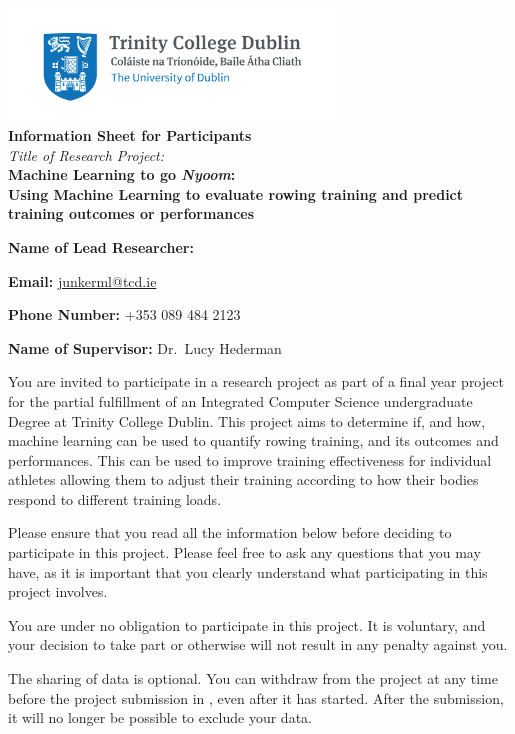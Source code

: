 \begin{center}
    \includegraphics[height=3cm]{info-sheet/Trinity_RGB_transparent_main.png}\\
    {\large\textbf{Information Sheet for Participants}}\\
    \textit{Title of Research Project:}\\
    \textbf{Machine Learning to go \emph{Nyoom}:}\\
    \textbf{Using Machine Learning to evaluate rowing training and predict training outcomes or performances}
\end{center}

\vspace{1cm}

\textbf{Name of Lead Researcher:} \authorname

\textbf{Email:} \href{mailto:junkerml@tcd.ie}{junkerml@tcd.ie}

\textbf{Phone Number:} +353 089 484 2123

\textbf{Name of Supervisor:} Dr.~Lucy Hederman

\vspace{1cm}

You are invited to participate in a research project as part of a final year project for the partial fulfillment of an Integrated Computer Science undergraduate Degree at Trinity College Dublin. This project aims to determine if, and how, machine learning can be used to quantify rowing training, and its outcomes and performances. This can be used to improve training effectiveness for individual athletes allowing them to adjust their training according to how their bodies respond to different training loads.

Please ensure that you read all the information below before deciding to participate in this project. Please feel free to ask any questions that you may have, as it is important that you clearly understand what participating in this project involves.

You are under no obligation to participate in this project. It is voluntary, and your decision to take part or otherwise will not result in any penalty against you.

The sharing of data is optional. You can withdraw from the project at any time before the project submission in \deadline, even after it has started. After the submission, it will no longer be possible to exclude your data.

